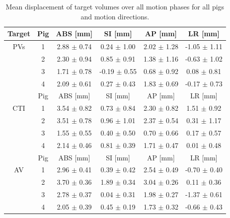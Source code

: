 \documentclass[type=dr, dr=rernat, accentcolor=tud7b,colorbacktitle, bigchapter, openright, twoside, 12pt ]{tudthesis}
\begin{document}
\newpage

\begin{table}[H]
  \centering
  \small
  \caption{Mean displacement of target volumes over all motion phases for all pigs and motion directions.}
  \begin{tabular}{|c|c|c|c|c|c|}
    \hline\hline
    Target & Pig & ABS [mm] & SI [mm] & AP [mm] & LR [mm] \\
    \hline
    PVs & 1 & 2.88 $\pm$ 0.74 & 0.24 $\pm$ 1.00 & 2.02 $\pm$ 1.28 & -1.05 $\pm$ 1.11 \\
    & 2 & 2.30 $\pm$ 0.94 & 0.85 $\pm$ 0.91 & 1.38 $\pm$ 1.16 & -0.63 $\pm$ 1.02 \\
    & 3 & 1.71 $\pm$ 0.78 & -0.19 $\pm$ 0.55 & 0.68 $\pm$ 0.92 & 0.08 $\pm$ 0.81 \\
    & 4 & 2.09 $\pm$ 0.61 & 0.27 $\pm$ 0.43 & 1.83 $\pm$ 0.69 & -0.17 $\pm$ 0.73 \\
    \hline\hline
    & Pig & ABS [mm] & SI [mm] & AP [mm] & LR [mm] \\
   \hline
    CTI & 1 & 3.54 $\pm$ 0.82 & 0.73 $\pm$ 0.84 & 2.30 $\pm$ 0.82 & 1.51 $\pm$ 0.92 \\
    & 2 & 3.51 $\pm$ 0.78 & 0.96 $\pm$ 1.01 & 2.37 $\pm$ 0.54 & 0.31 $\pm$ 1.17 \\
    & 3 & 1.55 $\pm$ 0.55 & 0.40 $\pm$ 0.50 & 0.70 $\pm$ 0.66 & 0.17 $\pm$ 0.57 \\
    & 4 & 2.14 $\pm$ 0.46 & 0.81 $\pm$ 0.39 & 1.71 $\pm$ 0.47 & 0.01 $\pm$ 0.48 \\
    \hline\hline
   & Pig & ABS [mm] & SI [mm] & AP [mm] & LR [mm] \\
   \hline
    AV & 1 & 2.96 $\pm$ 0.41 & 0.39 $\pm$ 0.42 & 2.54 $\pm$ 0.49 & -0.70 $\pm$ 0.40 \\
    & 2 & 3.70 $\pm$ 0.36 & 1.89 $\pm$ 0.34 & 3.04 $\pm$ 0.26 & 0.11 $\pm$ 0.36 \\
    & 3 & 2.78 $\pm$ 0.37 & 0.04 $\pm$ 0.31 & 1.98 $\pm$ 0.27 & -1.37 $\pm$ 0.61 \\
    & 4 & 2.05 $\pm$ 0.39 & 0.45 $\pm$ 0.19 & 1.73 $\pm$ 0.32 & -0.66 $\pm$ 0.43 \\
    \hline\hline
  \end{tabular}
  \label{tab:motion_allpigs}
\end{table}

\vspace*{0.4cm}
\end{document}
